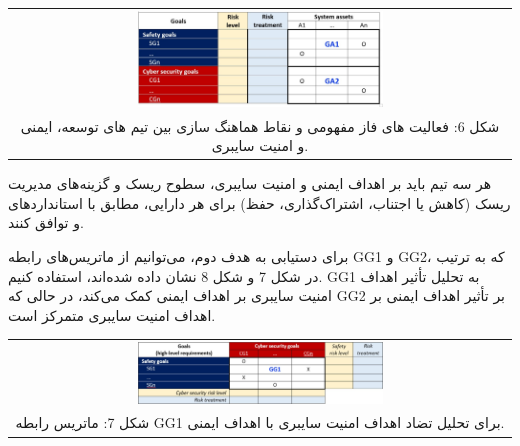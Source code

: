 \documentclass[a4paper,10pt]{article}
\begin{document}
                \begin{table}
            
                    \centering
                    \begin{tabular}{ c }
                        
                        \includegraphics[width=0.5\textwidth]{Image/fig6.jpg} \\
        
                        شکل 6: فعالیت های فاز مفهومی و نقاط هماهنگ سازی بین تیم های توسعه، ایمنی و امنیت سایبری.
        
                    \end{tabular}
        
                \end{table}

                هر سه تیم باید بر اهداف ایمنی و امنیت سایبری، سطوح ریسک و گزینه‌های مدیریت ریسک (کاهش یا اجتناب، اشتراک‌گذاری، حفظ) برای هر دارایی، مطابق با استانداردهای  و  توافق کنند.

                برای دستیابی به هدف دوم، می‌توانیم از ماتریس‌های رابطه GG1 و GG2، که به ترتیب در شکل 7 و شکل 8 نشان داده شده‌اند، استفاده کنیم. GG1 به تحلیل تأثیر اهداف امنیت سایبری بر اهداف ایمنی کمک می‌کند، در حالی که GG2 بر تأثیر اهداف ایمنی بر اهداف امنیت سایبری متمرکز است.

                \begin{table}
            
                    \centering
                    \begin{tabular}{ c }
                        
                        \includegraphics[width=0.5\textwidth]{Image/fig7.jpg} \\
        
                        شکل 7: ماتریس رابطه GG1 برای تحلیل تضاد اهداف امنیت سایبری با اهداف ایمنی.
        
                    \end{tabular}
        
                \end{table}
\end{document}

